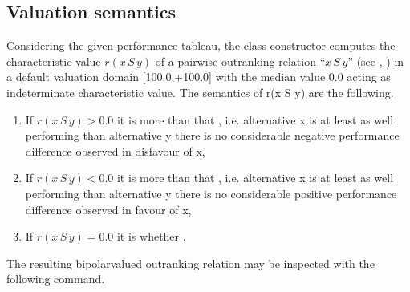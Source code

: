 \documentclass[a4paper,12pt,english]{sphinxhowto}
\begin{document}
\subsection{Valuation semantics}
\label{\detokenize{tutorial:valuation-semantics}}
Considering the given performance tableau, the  class constructor computes the characteristic value \(r(x\,S\,y)\) of a pairwise outranking relation “\(x\,S\,y\)” (see , ) in a default valuation domain {[}\sphinxhyphen{}100.0,+100.0{]} with the median value 0.0 acting as indeterminate characteristic value. The semantics of r(x S y) are the following.
\begin{enumerate}
%
\item {} 
If \(r(x\,S\,y) > 0.0\) it is more  than  that , i.e. alternative x is at least as well performing than alternative y  there is no considerable negative performance difference observed in disfavour of x,

\item {} 
If \(r(x\,S\,y) < 0.0\) it is more  than  that , i.e. alternative x is  at least as well performing than alternative y  there is no considerable positive performance difference observed in favour of x,

\item {} 
If \(r(x\,S\,y) = 0.0\) it is  whether .

\end{enumerate}

The resulting bipolar\sphinxhyphen{}valued outranking relation may be inspected with the following command.
\end{document}
